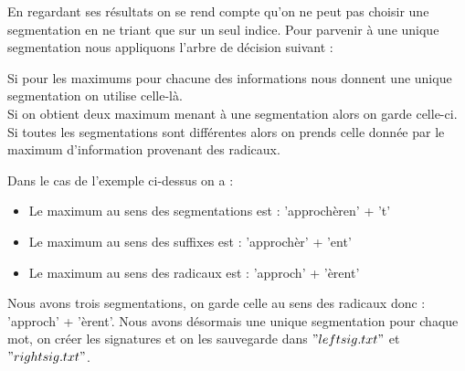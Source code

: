 \documentclass[11pt, oneside]{article}   	%
\begin{document}
En regardant ses résultats on se rend compte qu'on ne peut pas choisir une segmentation en ne triant que sur un seul indice. Pour parvenir à une unique segmentation nous appliquons l'arbre de décision suivant :

Si pour les maximums pour chacune des informations nous donnent une unique segmentation on utilise celle-là. \\
Si on obtient deux maximum menant à une segmentation alors on garde celle-ci. \\
Si toutes les segmentations sont différentes alors on prends celle donnée par le maximum d'information provenant des radicaux. 


Dans le cas de l'exemple ci-dessus on a : 
\begin{itemize}
\item Le maximum au sens des segmentations est : 'approchèren' + 't' \\ 
\item Le maximum au sens des suffixes est : 'approchèr' + 'ent' \\
\item Le maximum au sens des radicaux est : 'approch' + 'èrent' \\
\end{itemize}

Nous avons trois segmentations, on garde celle au sens des radicaux donc : 'approch' + 'èrent'. Nous avons désormais une unique segmentation pour chaque mot, on créer les signatures et on les sauvegarde
dans $"leftsig.txt"$ et $"rightsig.txt"$. 
\end{document}
